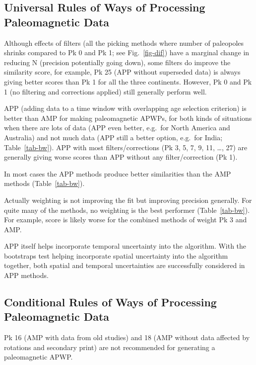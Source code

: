 \subsection{Universal Rules of Ways of Processing Paleomagnetic Data}
%
\begin{description}
  \item Although effects of filters (all the picking methods where number of
    paleopoles shrinks compared to Pk 0 and Pk 1; see Fig.~\ref{fig-dif}) have a
    marginal change in reducing N (precision potentially going down), some
    filters do improve the similarity score, for example, Pk 25 (APP without
    superseded data) is always giving better scores than Pk 1 for all the three
    continents. However, Pk 0 and Pk 1 (no filtering and corrections applied)
    still generally perform well.
  \item APP (adding data to a time window with overlapping age selection
    criterion) is better than AMP for making paleomagnetic APWPs, for both kinds
    of situations when there are lots of data (APP even better, e.g.\ for North
    America and Australia) and not much data (APP still a better option, e.g.\
    for India; Table~\ref{tab-bw}). APP with most filters/corrections (Pk 3, 5,
    7, 9, 11, \ldots, 27) are generally giving worse scores than APP without any
    filter/correction (Pk 1).
  \item In most cases the APP methods produce better similarities than the AMP
    methods (Table~\ref{tab-bw}).
  \item Actually weighting is not improving the fit but improving precision
    generally. For quite many of the methods, no weighting is the best performer
    (Table~\ref{tab-bw}). For example, score is likely worse for the combined
    methods of weight Pk 3 and AMP\@.
  \item APP itself helps incorporate temporal uncertainty into the algorithm.
    With the bootstraps test helping incorporate spatial uncertainty into the
    algorithm together, both spatial and temporal uncertainties are successfully
    considered in APP methods.
\end{description}

\subsection{Conditional Rules of Ways of Processing Paleomagnetic Data}
%
\begin{description}
  \item Pk 16 (AMP with data from old studies) and 18 (AMP without data affected
    by rotations and secondary print) are not recommended for generating a
    paleomagnetic APWP\@.
\end{description}

